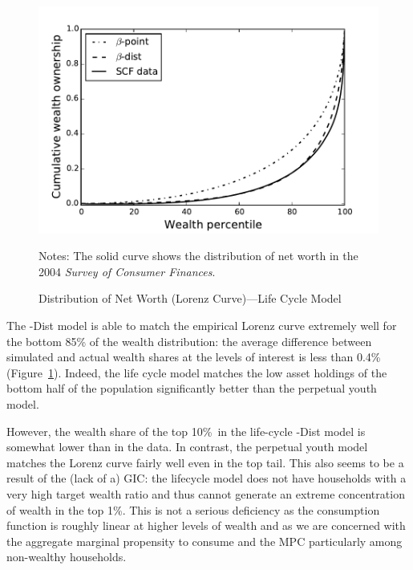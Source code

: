 \documentclass[12pt,titlepage]{econtex}
\begin{document}
\begin{figure}
  \caption{Distribution of Net Worth (Lorenz Curve)---Life Cycle Model}
  \label{LorenzLifecycle}
  \begin{center}
    \includegraphics{./Figures/LorenzLifecycle}
  \end{center}
   \footnotesize Notes: The solid curve shows the distribution of net worth in the 2004 \emph{Survey of Consumer Finances}.
\end{figure}

The \Discount-Dist model is able to match the empirical Lorenz curve extremely well for the bottom 85\% of the wealth distribution: the average difference between simulated and actual wealth shares at the levels of interest is less than 0.4\% (Figure~\ref{LorenzLifecycle}).  Indeed, the life cycle model matches the low asset holdings of the bottom half of the population significantly better than the perpetual youth model.

However, the wealth share of the top 10\%\ in the life-cycle \Discount-Dist model is somewhat lower than in the data. In contrast, the perpetual youth model matches the Lorenz curve fairly well even in the top tail.  This also seems to be a result of the (lack of a) GIC: the lifecycle model does not have households with a very high target wealth ratio and thus cannot generate an extreme concentration of wealth in the top 1\%.  This is not a serious deficiency as the consumption function is roughly linear at higher levels of wealth and as we are concerned with the aggregate marginal propensity to consume and the MPC particularly among non-wealthy households.
\end{document}
